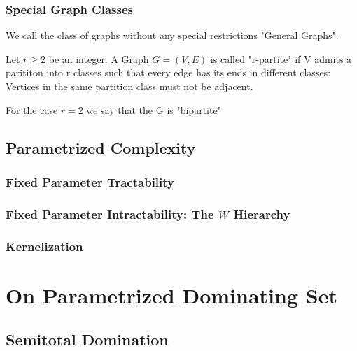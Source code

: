 \subsection*{Special Graph Classes}
We call the class of graphs without any special restrictions "General Graphs".

\begin{definition}
    Let $r \geq 2$ be an integer. A Graph $G = (V,E)$ is called "r-partite" if V admits a parititon into r classes such that every edge has its ends in different classes: Vertices in the same partition class must not be adjacent. 
    
    For the case $r = 2$ we say that the G is "bipartite" 

\end{definition}

\begin{definition}
    
\end{definition}

\begin{definition}
    
\end{definition}


\section{Parametrized Complexity}

\subsection{Fixed Parameter Tractability}
\subsection{Fixed Parameter Intractability: The \hmath $W$ Hierarchy}
\subsection{Kernelization}


\chapter{On Parametrized Dominating Set}
\section{Semitotal Domination}

